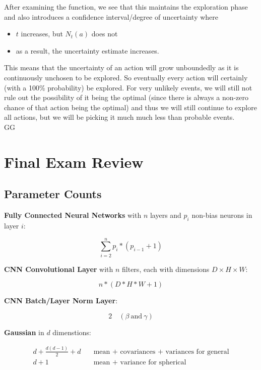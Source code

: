 \documentclass[12pt]{article}
\begin{document}
After examining the function, we see that this maintains the exploration phase and also introduces a confidence interval/degree of uncertainty where 

\begin{itemize}
	\item $t$ increases, but $N_t(a)$ does not
	\item as a result, the uncertainty estimate increases.
\end{itemize}

This means that the uncertainty of an action will grow unboundedly as it is continuously unchosen to be explored. So eventually every action will certainly (with a 100\% probability) be explored. For very unlikely events, we will still not rule out the possibility of it being the optimal (since there is always a non-zero chance of that action being the optimal) and thus we will still continue to explore all actions, but we will be picking it much much less than probable events.\\

GG

\newpage

\section{Final Exam Review}

\subsection{Parameter Counts}

\textbf{Fully Connected Neural Networks} with $n$ layers and $p_i$ non-bias neurons in layer $i$:

\[ \sum_{i = 2}^n p_i * (p_{i-1} + 1) \]

\textbf{CNN Convolutional Layer} with $n$ filters, each with dimensions $D \times H \times W$:

\[ n * (D*H*W + 1) \]

\textbf{CNN Batch/Layer Norm Layer}: 

\[ 2 \quad (\beta ~ \text{and} ~ \gamma) \]

\textbf{Gaussian} in $d$ dimenstions:

\[ 
	\begin{aligned}
		d + \frac {d(d-1)} 2 + d &\quad \text{mean + covariances + variances for general}\\
		d + 1 &\quad \text{mean + variance for spherical}
	\end{aligned}
\]
\end{document}
